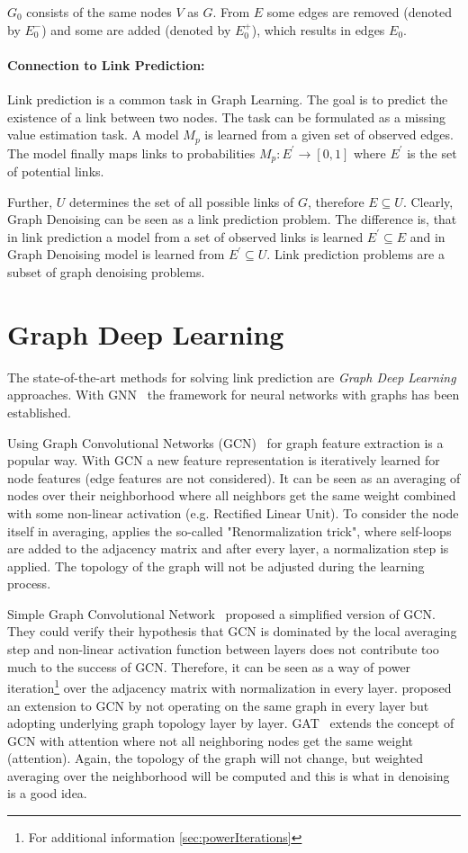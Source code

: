 $G_0$ consists of the same nodes $V$ as $G$. 
From $E$ some edges are removed (denoted by $E^{-}_0$) and some are added
(denoted by $E^{+}_0$), which results in edges $E_0$.

\paragraph{Connection to Link Prediction:}
Link prediction is a common task in Graph Learning. 
The goal is to predict the existence of a link between two nodes.
The task can be formulated as a missing value estimation task. A model $M_p$ is learned
from a given set of observed edges. The model finally maps links to probabilities
$M_p : E^{\prime} \rightarrow [0,1]$ where $E^{\prime}$ is the set of potential links.

Further, $U$ determines the set of all possible links of $G$, therefore $E \subseteq U$.
Clearly, Graph Denoising can be seen as a link prediction problem.
The difference is, that in link prediction a model from a set of observed links is learned
$E^{\prime} \subseteq E$ and in Graph Denoising model is learned from 
$E^{\prime} \subseteq U$.
Link prediction problems are a subset of graph denoising problems.

\section{Graph Deep Learning}
\label{sec:graph_depp_learning}
The state-of-the-art methods for solving link prediction are \textit{Graph Deep Learning} approaches.
With GNN~\cite{GNN} the framework for neural networks with graphs has been established. 

Using Graph Convolutional Networks (GCN)~\cite{GCN} for graph feature extraction is a popular way. 
With GCN a new feature representation is iteratively learned for node features (edge features are not considered).
It can be seen as an averaging of nodes over their neighborhood where all neighbors get the same weight combined with some non-linear activation (e.g. Rectified Linear Unit). 
To consider the node itself in averaging, \citet{GCN} applies the so-called "Renormalization trick", where self-loops are added to the 
adjacency matrix and after every layer, a normalization step is applied. 
The topology of the graph will not be adjusted during the learning process.

Simple Graph Convolutional Network~\cite{simpleGCN} proposed a simplified version of GCN.
They could verify their hypothesis that GCN is dominated by the local averaging step and non-linear 
activation function between layers does not contribute too much to the success of GCN. 
Therefore, it can be seen as a way of power iteration\footnote{For additional information \ref{sec:powerIterations}}
over the adjacency matrix with normalization in every layer.
\citet{dynamicGCN} proposed an extension to GCN by not operating on the same graph in every layer but adopting
underlying graph topology layer by layer.
GAT~\cite{GAT} extends the concept of GCN with attention where not all neighboring nodes get the same weight (attention).
Again, the topology of the graph will not change, but weighted averaging over the neighborhood 
will be computed and this is what in denoising is a good idea.
